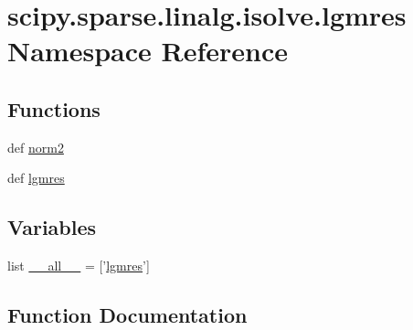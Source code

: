\hypertarget{namespacescipy_1_1sparse_1_1linalg_1_1isolve_1_1lgmres}{}\section{scipy.\+sparse.\+linalg.\+isolve.\+lgmres Namespace Reference}
\label{namespacescipy_1_1sparse_1_1linalg_1_1isolve_1_1lgmres}
\subsection*{Functions}
\begin{DoxyCompactItemize}
\item 
def \hyperlink{namespacescipy_1_1sparse_1_1linalg_1_1isolve_1_1lgmres_adfcba7dba79a89000ee37073793542b6}{norm2}
\item 
def \hyperlink{namespacescipy_1_1sparse_1_1linalg_1_1isolve_1_1lgmres_a39e6b3de0b8bfcce7a5e87e2d6fa95c5}{lgmres}
\end{DoxyCompactItemize}
\subsection*{Variables}
\begin{DoxyCompactItemize}
\item 
list \hyperlink{namespacescipy_1_1sparse_1_1linalg_1_1isolve_1_1lgmres_ae40f4e30790d7296b05fd564e2932cde}{\+\_\+\+\_\+all\+\_\+\+\_\+} = \mbox{[}'\hyperlink{namespacescipy_1_1sparse_1_1linalg_1_1isolve_1_1lgmres_a39e6b3de0b8bfcce7a5e87e2d6fa95c5}{lgmres}'\mbox{]}
\end{DoxyCompactItemize}


\subsection{Function Documentation}
\hypertarget{namespacescipy_1_1sparse_1_1linalg_1_1isolve_1_1lgmres_a39e6b3de0b8bfcce7a5e87e2d6fa95c5}{}
